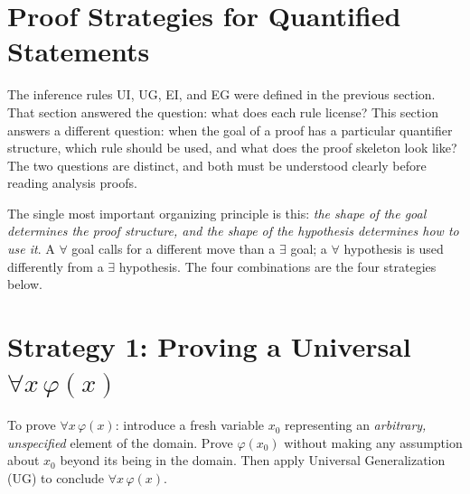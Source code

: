 
\section{Proof Strategies for Quantified Statements}


\begin{exposition}
The inference rules UI, UG, EI, and EG were defined in the previous section.
That section answered the question: what does each rule license? This section
answers a different question: when the goal of a proof has a particular
quantifier structure, which rule should be used, and what does the proof
skeleton look like? The two questions are distinct, and both must be understood
clearly before reading analysis proofs.
\end{exposition}

\begin{exposition}
The single most important organizing principle is this: \emph{the shape of the
goal determines the proof structure, and the shape of the hypothesis determines
how to use it}. A $\forall$ goal calls for a different move than a $\exists$
goal; a $\forall$ hypothesis is used differently from a $\exists$ hypothesis.
The four combinations are the four strategies below.
\end{exposition}


\section*{\texorpdfstring{Strategy 1: Proving a Universal $\forall x\,\varphi(x)$}{Strategy 1: Proving a Universal forall x phi(x)}}

\begin{exposition}
To prove $\forall x\,\varphi(x)$: introduce a fresh variable $x_0$ representing
an \emph{arbitrary, unspecified} element of the domain. Prove $\varphi(x_0)$
without making any assumption about $x_0$ beyond its being in the domain. Then
apply Universal Generalization (UG) to conclude $\forall x\,\varphi(x)$.
\end{exposition}

